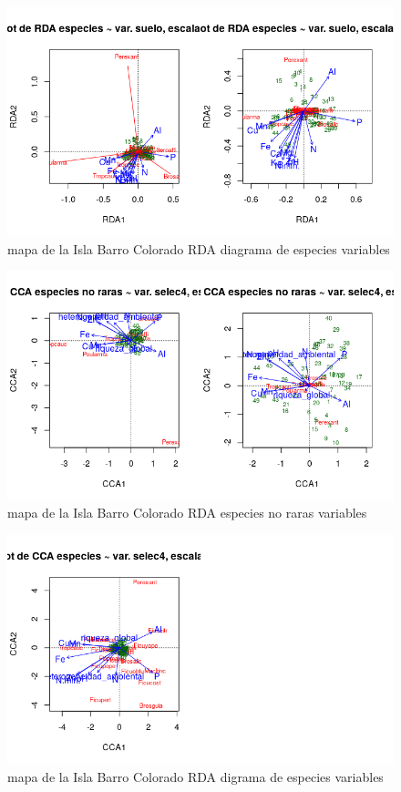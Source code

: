 \documentclass[11pt,]{article}
\begin{document}
\begin{figure}
\centering
\includegraphics[width=1.00000\textwidth]{rda_escala_especies.png}
\caption{mapa de la Isla Barro Colorado RDA diagrama de especies
variables\label{fig:bci_map}}
\end{figure}

\begin{figure}
\centering
\includegraphics[width=1.00000\textwidth]{rda_escalamiento_escala_5.png}
\caption{mapa de la Isla Barro Colorado RDA especies no raras
variables\label{fig:bci_map}}
\end{figure}

\begin{figure}
\centering
\includegraphics[width=1.00000\textwidth]{rda_especies_escala_4.png}
\caption{mapa de la Isla Barro Colorado RDA digrama de especies
variables\label{fig:bci_map}}
\end{figure}
\end{document}
